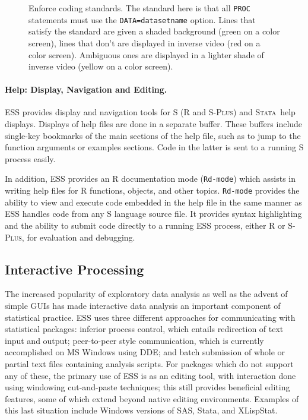 \documentclass{article}
\newcommand*{\Splus}{\textsc{S-Plus}}
\newcommand*{\Stata}{\textsc{Stata}}
\newcommand{\stexttt}[1]{{\small\texttt{#1}}}
\begin{document}
\begin{figure}[tbp]
  \caption{Enforce coding standards.  The standard here is
    that all \stexttt{PROC} statements must use the
    \stexttt{DATA=datasetname} option.  Lines that satisfy the
    standard are given a shaded background (green on a color screen),
    lines that don't are displayed in inverse video (red on a color
    screen).  Ambiguous ones are displayed in a lighter shade of
    inverse video (yellow on a color screen).}
  \label{f.hilock}
\end{figure}

\paragraph{Help: Display, Navigation and Editing.}
ESS provides display and navigation tools for S (R and \Splus) and
\Stata\ help displays.  Displays of help files are done in a separate
buffer.  These buffers include single-key bookmarks of the main
sections of the help file, such as to jump to the function arguments or
examples sections.  Code in the latter is sent to a running S process
easily. %

In addition, ESS provides an R documentation mode (\stexttt{Rd-mode})
which assists in writing help files for R functions, objects, and
other topics.  \stexttt{Rd-mode} provides the ability to view and
execute code embedded in the help file in the same manner as ESS
handles code from any S language source file.  It provides syntax
highlighting and the ability to submit code directly to a running ESS
process, either R or \Splus, for evaluation and debugging.

\subsection{Interactive Processing}
\label{sec:interactive}

The increased popularity of exploratory data analysis as well as the
advent of simple GUIs has made interactive data analysis an important
component of statistical practice.  ESS uses three different
approaches for communicating with statistical packages: inferior
process control, which entails redirection of text input and output;
peer-to-peer style communication, which is currently accomplished on
MS Windows using DDE; and batch submission of whole or partial text
files containing analysis scripts.  For packages which do not support
any of these, the primary use of ESS is as an editing tool, with
interaction done using windowing cut-and-paste techniques; this still
provides beneficial editing features, some of which extend beyond
native editing environments.  Examples of this last situation include
Windows versions of SAS, Stata, and XLispStat.
\end{document}
